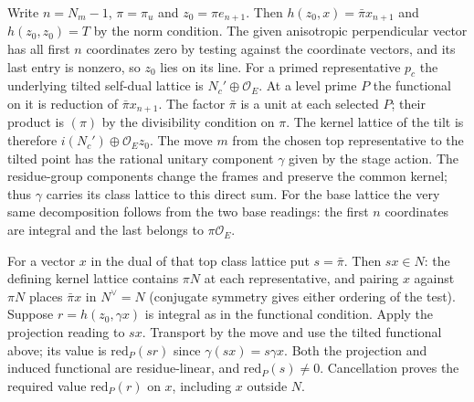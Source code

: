 Write $n=N_m-1$, $\pi=\pi_u$ and $z_0=\pi e_{n+1}$.
Then $h(z_0,x)=\bar\pi x_{n+1}$ and $h(z_0,z_0)=T$ by the
norm condition. The given anisotropic perpendicular vector has all
first $n$ coordinates zero by testing against the coordinate vectors,
and its last entry is nonzero, so $z_0$ lies on its line.
For a primed representative $p_c$ the underlying tilted self-dual
lattice is $N_c'\oplus\mathcal O_E$. At a level prime $P$ the
functional on it is reduction of $\bar\pi x_{n+1}$. The factor
$\bar\pi$ is a unit at each selected $P$; their product is $(\pi)$
by the divisibility condition on $\pi$. The kernel lattice of the
tilt is therefore $i(N_c')\oplus\mathcal O_E z_0$. The move
$m$ from the chosen top representative to the tilted point has the
rational unitary component $\gamma$ given by the stage action. The
residue-group components change the frames and preserve the common
kernel; thus $\gamma$ carries its class lattice to this direct sum.
For the base lattice the very same decomposition follows from
the two base readings: the first $n$ coordinates are integral and
the last belongs to $\pi\mathcal O_E$.

For a vector $x$ in the dual of that top class lattice put
$s=\bar\pi$. Then $sx\in N$: the defining kernel lattice contains
$\pi N$ at each representative, and pairing $x$ against $\pi N$
places $\bar\pi x$ in $N^\vee=N$ (conjugate symmetry gives either
ordering of the test). Suppose $r=h(z_0,\gamma x)$ is integral as
in the functional condition. Apply the projection reading to $sx$.
Transport by the move and use the tilted functional above; its value
is $\mathrm{red}_P(sr)$ since $\gamma(sx)=s\gamma x$.
Both the projection and induced functional are residue-linear, and
$\mathrm{red}_P(s)\ne0$. Cancellation proves the required value
$\mathrm{red}_P(r)$ on $x$, including $x$ outside $N$.

